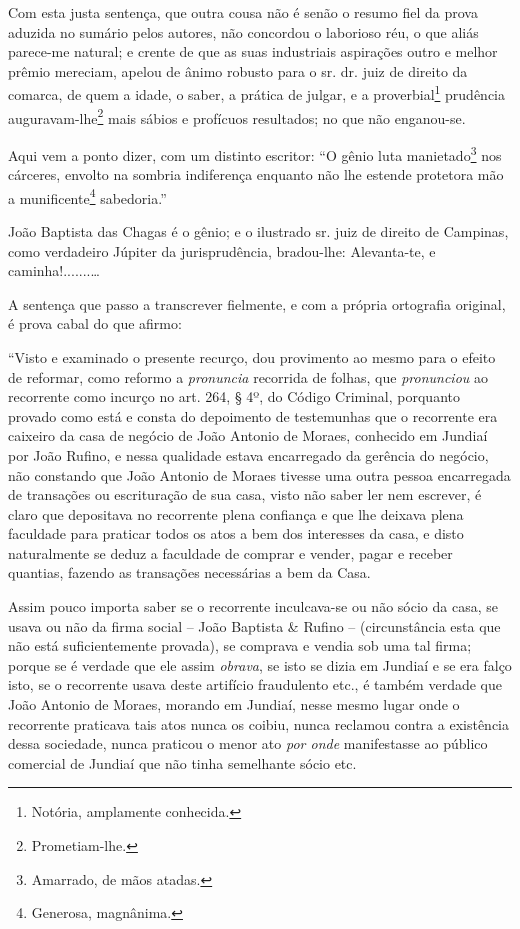 {Com esta justa sentença, que outra cousa não é senão o resumo fiel da
prova aduzida no sumário pelos autores, não concordou o laborioso réu, o
que aliás parece-me natural; e crente de que as suas industriais
aspirações outro e melhor prêmio mereciam, apelou de ânimo robusto para
o sr. dr. juiz de direito da comarca, de quem a idade, o saber, a
prática de julgar, e a proverbial\footnote{ Notória, amplamente
  conhecida.} prudência auguravam-lhe\footnote{ Prometiam-lhe.} mais
sábios e profícuos resultados; no que não enganou-se.

Aqui vem a ponto dizer, com um distinto escritor: ``O gênio luta
manietado\footnote{ Amarrado, de mãos atadas.} nos cárceres, envolto na
sombria indiferença enquanto não lhe estende protetora mão a
munificente\footnote{ Generosa, magnânima.} sabedoria.''

João Baptista das Chagas é o gênio; e o ilustrado sr. juiz de direito de
Campinas, como verdadeiro Júpiter da jurisprudência, bradou-lhe:
Alevanta-te, e caminha!.......\ldots{}

A sentença que passo a transcrever fielmente, e com a própria ortografia
original, é prova cabal do que afirmo:

``Visto e examinado o presente recurço, dou provimento ao mesmo para o
efeito de reformar, como reformo a \emph{pronuncia} recorrida de folhas,
que \emph{pronunciou} ao recorrente como incurço no art. 264, § 4º, do
Código Criminal, porquanto provado como está e consta do depoimento de
testemunhas que o recorrente era caixeiro da casa de negócio de João
Antonio de Moraes, conhecido em Jundiaí por João Rufino, e nessa
qualidade estava encarregado da gerência do negócio, não constando que
João Antonio de Moraes tivesse uma outra pessoa encarregada de
transações ou escrituração de sua casa, visto não saber ler nem
escrever, é claro que depositava no recorrente plena confiança e que lhe
deixava plena faculdade para praticar todos os atos a bem dos interesses
da casa, e disto naturalmente se deduz a faculdade de comprar e vender,
pagar e receber quantias, fazendo as transações necessárias a bem da
Casa.

Assim pouco importa saber se o recorrente inculcava-se ou não sócio da
casa, se usava ou não da firma social -- João Baptista \& Rufino --
(circunstância esta que não está suficientemente provada), se comprava e
vendia sob uma tal firma; porque se é verdade que ele assim
\emph{obrava}, se isto se dizia em Jundiaí e se era falço isto, se o
recorrente usava deste artifício fraudulento etc., é também verdade que
João Antonio de Moraes, morando em Jundiaí, nesse mesmo lugar onde o
recorrente praticava tais atos nunca os coibiu, nunca reclamou contra a
existência dessa sociedade, nunca praticou o menor ato \emph{por onde}
manifestasse ao público comercial de Jundiaí que não tinha semelhante
sócio etc.

}
